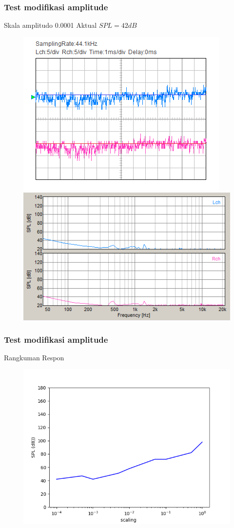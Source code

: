 \documentclass[table,dvipsnames,10pt]{beamer}
\begin{document}
	\begin{frame}[fragile]
	\frametitle{Test modifikasi amplitude}
	\begin{exampleblock}{Skala amplitudo 0.0001}
		Aktual $SPL = 42 dB$
		\begin{figure}[H]
			\centering
			\includegraphics[width=0.4\linewidth]{result/day_4/500Hz/tone00001}
			\includegraphics[width=0.45\linewidth]{result/day_4/500Hz/fft_tone00001}
		\end{figure}
	\end{exampleblock}
	\end{frame}

	\begin{frame}[fragile]
	\frametitle{Test modifikasi amplitude}
	\begin{exampleblock}{Rangkuman Respon}
		\begin{figure}[H]
			\centering
			\includegraphics[width=0.45\linewidth]{result/analisa/ampl_scaling}
		\end{figure}
	\end{exampleblock}
	\end{frame}
\end{document}
